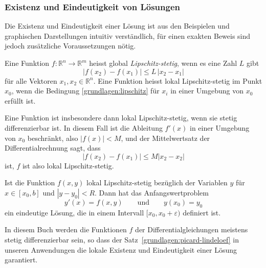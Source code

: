\subsubsection{Existenz und Eindeutigkeit von Lösungen}
Die Existenz und Eindeutigkeit einer Lösung ist aus den Beispielen und
graphischen Darstellungen intuitiv verständlich, für einen exakten
Beweis sind jedoch zusätzliche Voraussetzungen nötig.

\begin{definition}
Eine Funktion $f\colon \mathbb R^n\to\mathbb R^m$ heisst global
{\em Lipschitz-stetig},
%
wenn es eine Zahl $L$ gibt 
\begin{equation}
|f(x_2)-f(x_1)| \le L\,|x_2-x_1|
\label{grundlagen:lipschitz}
\end{equation}
für alle Vektoren $x_1,x_2\in\mathbb R^n$.
Eine Funktion heisst lokal Lipschitz-stetig im Punkt $x_0$, wenn die
Bedingung \eqref{grundlagen:lipschitz} für $x_i$ in einer Umgebung von
$x_0$ erfüllt ist.
\end{definition}

Eine Funktion ist insbesondere dann lokal Lipschitz-stetig, wenn sie
stetig differenzierbar ist.
In diesem Fall ist die Ableitung $f'(x)$ in einer Umgebung von $x_0$
beschränkt, also $|f(x)|<M$, und der Mittelwertsatz der Differentialrechnung
sagt, dass
\[
|f(x_2)-f(x_1)|\le M |x_2-x_2|
\]
ist, $f$ ist also lokal Lipschitz-stetig.

\begin{satz}
\label{grundlagen:picard-lindeloef}
%
%
Ist die Funktion $f(x,y)$ lokal Lipschitz-stetig bezüglich der Variablen
$y$ für $x\in[x_0,b]$ und $|y-y_0|<R$.
Dann hat das Anfangswertproblem
\[
y'(x)=f(x,y)\qquad\text{und}\qquad y(x_0)=y_0
\]
ein eindeutige Lösung, die in einem Intervall $[x_0,x_0+\varepsilon)$
definiert ist.
\end{satz}
%
%

In diesem Buch werden die Funktionen $f$ der Differentialgleichungen 
meistens stetig differenzierbar sein, so dass der
Satz~\ref{grundlagen:picard-lindeloef} in unseren Anwendungen die lokale
Existenz und Eindeutigkeit einer Lösung garantiert.

